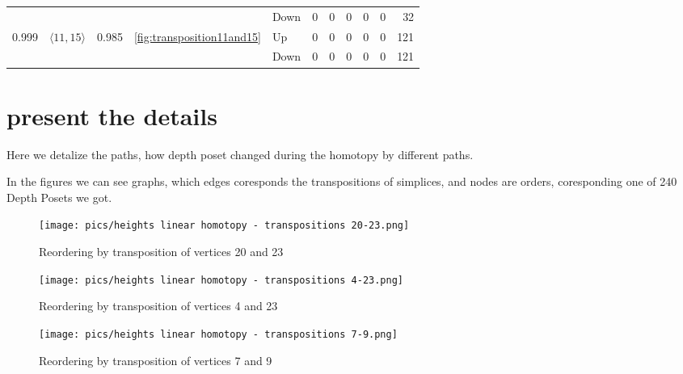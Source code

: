 \documentclass{article}
\begin{document}
\begin{center}
\begin{tabular}{lllllrrrrrr}
 &  &  &  & Down & 0 & 0 & 0 & 0 & 0 & 32 \\
\cline{1-11} \cline{2-11} \cline{3-11} \cline{4-11}
\multirow[t]{2}{*}{0.999} & \multirow[t]{2}{*}{$\langle11, 15\rangle$} & \multirow[t]{2}{*}{0.985} & \multirow[t]{2}{*}{\ref{fig:transposition11and15}} & Up & 0 & 0 & 0 & 0 & 0 & 121 \\
 &  &  &  & Down & 0 & 0 & 0 & 0 & 0 & 121 \\
\cline{1-11} \cline{2-11} \cline{3-11} \cline{4-11}
\bottomrule
\end{tabular}

\end{center}
\newpage 


\section{present the details}
\par Here we detalize the paths, how depth poset changed during the homotopy by different paths.
\par In the figures we can see graphs, which edges coresponds the transpositions of simplices, and nodes are orders, coresponding one of 240 Depth Posets we got.
\begin{figure}[htbp]
    \centering
    \texttt{[image: pics/heights linear homotopy - transpositions 20-23.png]}
    \caption{Reordering by transposition of vertices 20 and 23}
    \label{fig:transposition20and23}
\end{figure}
\begin{figure}[htbp]
    \centering
    \texttt{[image: pics/heights linear homotopy - transpositions 4-23.png]}
    \caption{Reordering by transposition of vertices 4 and 23}
    \label{fig:transposition4and23}
\end{figure}
\begin{figure}[htbp]
    \centering
    \texttt{[image: pics/heights linear homotopy - transpositions 7-9.png]}
    \caption{Reordering by transposition of vertices 7 and 9}
    \label{fig:transposition7and9}
\end{figure}
\end{document}
